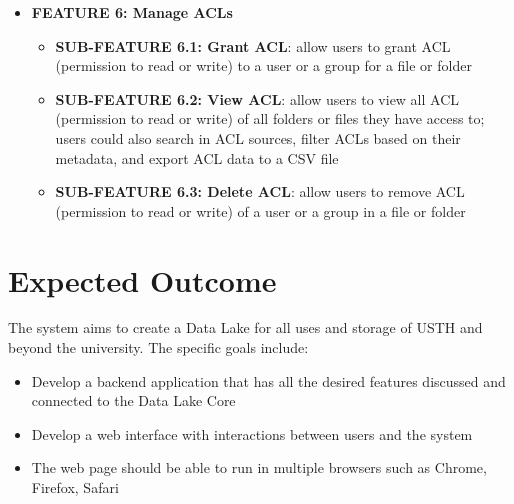 \begin{itemize}
    \item \textbf{FEATURE 6: Manage ACLs}
    \begin{itemize}
        \item \textbf{SUB-FEATURE 6.1: Grant ACL}: allow users to grant ACL (permission to read or write) to a user or a group for a file or folder
        \item \textbf{SUB-FEATURE 6.2: View ACL}: allow users to view all ACL (permission to read or write) of all folders or files they have access to; users could also search in ACL sources, filter ACLs based on their metadata, and export ACL data to a CSV file
        \item \textbf{SUB-FEATURE 6.3: Delete ACL}: allow users to remove ACL (permission to read or write) of a user or a group in a file or folder
    \end{itemize}
\end{itemize}
\section{Expected Outcome}
The system aims to create a Data Lake for all uses and storage of USTH and beyond the university. The specific goals include:
\begin{itemize}
    \item Develop a backend application that has all the desired features discussed and connected to the Data Lake Core
    \item Develop a web interface with interactions between users and the system
    \item The web page should be able to run in multiple browsers such as Chrome, Firefox, Safari 
\end{itemize}


